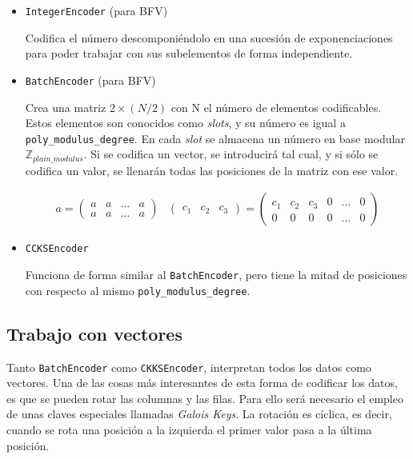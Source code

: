\begin{itemize}
    \item \verb|IntegerEncoder| (para BFV)

    Codifica el número descomponiéndolo en una sucesión de exponenciaciones para poder trabajar con sus subelementos de forma independiente.

    \item \verb|BatchEncoder| (para BFV)

    Crea una matriz $2 \times (N/2)$ con N el número de elementos codificables. Estos elementos son conocidos como \textit{slots}, y su número es igual a \verb|poly_modulus_degree|. En cada \textit{slot} se almacena un número en base modular $\mathbb{Z}_{plain\_modulus}$. Si se codifica un vector, se introducirá tal cual, y si sólo se codifica un valor, se llenarán todas las posiciones de la matriz con ese valor.

    \begin{gather}
        a =
        \begin{pmatrix}
        a & a & \hdots & a \\
        a & a & \hdots & a
        \end{pmatrix} &
        \begin{pmatrix}
        c_1 & c_2 & c_3
        \end{pmatrix}
        =
        \begin{pmatrix}
        c_1 & c_2   & c_3   & 0     & \hdots & 0 \\
        0   & 0     & 0     & 0     & \hdots & 0
        \end{pmatrix}
    \end{gather}

    \item \verb|CCKSEncoder|

    Funciona de forma similar al \verb|BatchEncoder|, pero tiene la mitad de posiciones con respecto al mismo \verb|poly_modulus_degree|.
\end{itemize}{}

\subsection{Trabajo con vectores}

Tanto \verb|BatchEncoder| como \verb|CKKSEncoder|, interpretan todos los datos como vectores. Una de las cosas más interesantes de esta forma de codificar los datos, es que se pueden rotar las columnas y las filas. Para ello será necesario el empleo de unas claves especiales llamadas \textit{Galois Keys}. La rotación es cíclica, es decir, cuando se rota una posición a la izquierda el primer valor pasa a la última posición.

